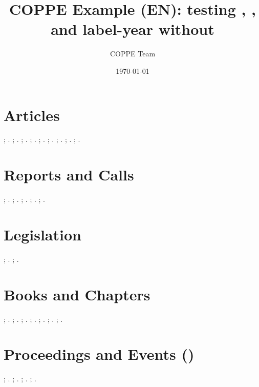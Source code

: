 \documentclass[a4paper,12pt]{article}
\title{COPPE Example (EN): testing \string\printurldate, \string\printeventdate, and label-year without \string\urldate}
\author{COPPE Team}
\date{\today}
\begin{document}
\maketitle
\section*{Articles}
\citet{art-1-complete-doi}; \citep{art-1-complete-doi}.
\citet{art-2-missing-doi-has-url}; \citep{art-2-missing-doi-has-url}.
\citet{art-3-missing-author}; \citep{art-3-missing-author}.
\citet{mag-1-complete}; \citep{mag-1-complete}.
\citet{mag-2-missing-url}; \citep{mag-2-missing-url}.
\citet{news-1-complete}; \citep{news-1-complete}.
\citet{news-2-missing-pages}; \citep{news-2-missing-pages}.
\citet{dou-1-complete}; \citep{dou-1-complete}.
\citet{dou-2-missing-dousection}; \citep{dou-2-missing-dousection}.
\section*{Reports and Calls}
\citet{rep-1-generic-complete}; \citep{rep-1-generic-complete}.
\citet{rep-2-generic-missing-org}; \citep{rep-2-generic-missing-org}.
\citet{edital-1-complete}; \citep{edital-1-complete}.
\citet{edital-2-missing-modalidade}; \citep{edital-2-missing-modalidade}.
\citet{edital-3-missing-objeto}; \citep{edital-3-missing-objeto}.
\section*{Legislation}
\citet{leg-1-complete}; \citep{leg-1-complete}.
\citet{leg-2-missing-ementa}; \citep{leg-2-missing-ementa}.
\section*{Books and Chapters}
\citet{book-1-complete}; \citep{book-1-complete}.
\citet{book-2-missing-author-has-editor}; \citep{book-2-missing-author-has-editor}.
\citet{book-3-missing-publisher-location}; \citep{book-3-missing-publisher-location}.
\citet{incoll-1-complete}; \citep{incoll-1-complete}.
\citet{incoll-2-missing-editor}; \citep{incoll-2-missing-editor}.
\citet{inbook-1-complete}; \citep{inbook-1-complete}.
\citet{inbook-2-missing-edition}; \citep{inbook-2-missing-edition}.
\section*{Proceedings and Events (\string\printeventdate)}
\citet{inproc-1-complete}; \citep{inproc-1-complete}.
\citet{inproc-2-missing-event}; \citep{inproc-2-missing-event}.
\citet{proc-1-complete}; \citep{proc-1-complete}.
\citet{proc-2-missing-event}; \citep{proc-2-missing-event}.
\end{document}
